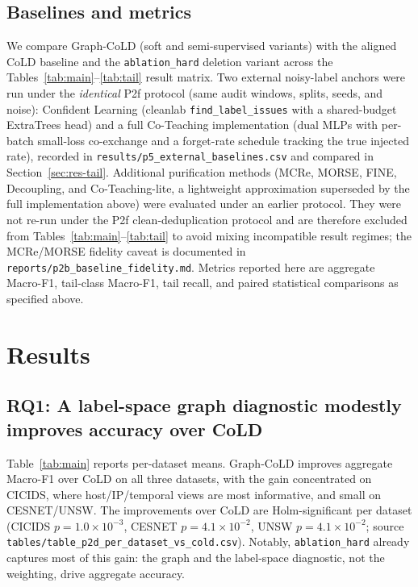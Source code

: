 \documentclass[preprint,3p,times]{elsarticle}
\begin{document}
\subsection{Baselines and metrics}
We compare Graph-CoLD (soft and semi-supervised variants) with the aligned CoLD
baseline and the \texttt{ablation\_hard} deletion variant across the
Tables~\ref{tab:main}--\ref{tab:tail} result matrix. Two external noisy-label
anchors were run under the \emph{identical} P2f protocol (same audit windows,
splits, seeds, and noise): Confident Learning (cleanlab \texttt{find\_label\_issues}
with a shared-budget ExtraTrees head) and a full Co-Teaching implementation
(dual MLPs with per-batch small-loss co-exchange and a forget-rate schedule
tracking the true injected rate), recorded in
\texttt{results/p5\_external\_baselines.csv} and compared in
Section~\ref{sec:res-tail}. Additional purification
methods (MCRe, MORSE, FINE, Decoupling, and Co-Teaching-lite, a lightweight
approximation superseded by the full implementation above) were evaluated
under an earlier protocol. They were not re-run under the P2f clean-deduplication
protocol and are therefore excluded from Tables~\ref{tab:main}--\ref{tab:tail}
to avoid mixing incompatible result regimes; the MCRe/MORSE fidelity caveat is
documented in \texttt{reports/p2b\_baseline\_fidelity.md}. Metrics reported here
are aggregate Macro-F1, tail-class Macro-F1, tail recall, and paired statistical
comparisons as specified above.

\section{Results}
\subsection{RQ1: A label-space graph diagnostic modestly improves accuracy over CoLD}
\label{sec:res-aggregate}
Table~\ref{tab:main} reports per-dataset means. Graph-CoLD improves aggregate
Macro-F1 over CoLD on all three datasets, with the gain concentrated on CICIDS,
where host/IP/temporal views are most informative, and small on CESNET/UNSW. The
improvements over CoLD are Holm-significant per dataset (CICIDS $p=1.0\times10^{-3}$,
CESNET $p=4.1\times10^{-2}$, UNSW $p=4.1\times10^{-2}$;
source \texttt{tables/table\_p2d\_per\_dataset\_vs\_cold.csv}). Notably,
\texttt{ablation\_hard} already captures most of this gain: the graph and the
label-space diagnostic, not the weighting, drive aggregate accuracy.
\end{document}
